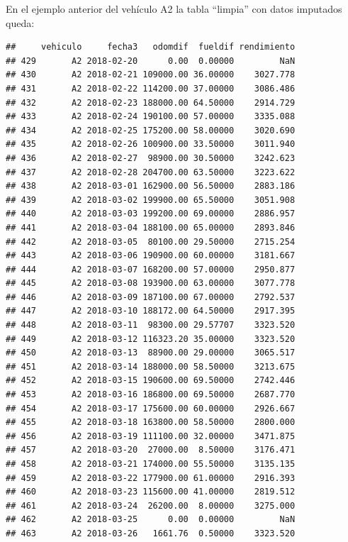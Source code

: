 \documentclass[]{article}
\newenvironment{Shaded}{\begin{snugshade}}{\end{snugshade}}
\newcommand{\StringTok}[1]{\textcolor[rgb]{0.31,0.60,0.02}{#1}}
\newcommand{\OperatorTok}[1]{\textcolor[rgb]{0.81,0.36,0.00}{\textbf{#1}}}
\newcommand{\NormalTok}[1]{#1}
\begin{document}
En el ejemplo anterior del vehículo A2 la tabla ``limpia'' con datos
imputados queda:

\begin{Shaded}
\end{Shaded}

\begin{verbatim}
##     vehiculo     fecha3   odomdif  fueldif rendimiento
## 429       A2 2018-02-20      0.00  0.00000         NaN
## 430       A2 2018-02-21 109000.00 36.00000    3027.778
## 431       A2 2018-02-22 114200.00 37.00000    3086.486
## 432       A2 2018-02-23 188000.00 64.50000    2914.729
## 433       A2 2018-02-24 190100.00 57.00000    3335.088
## 434       A2 2018-02-25 175200.00 58.00000    3020.690
## 435       A2 2018-02-26 100900.00 33.50000    3011.940
## 436       A2 2018-02-27  98900.00 30.50000    3242.623
## 437       A2 2018-02-28 204700.00 63.50000    3223.622
## 438       A2 2018-03-01 162900.00 56.50000    2883.186
## 439       A2 2018-03-02 199900.00 65.50000    3051.908
## 440       A2 2018-03-03 199200.00 69.00000    2886.957
## 441       A2 2018-03-04 188100.00 65.00000    2893.846
## 442       A2 2018-03-05  80100.00 29.50000    2715.254
## 443       A2 2018-03-06 190900.00 60.00000    3181.667
## 444       A2 2018-03-07 168200.00 57.00000    2950.877
## 445       A2 2018-03-08 193900.00 63.00000    3077.778
## 446       A2 2018-03-09 187100.00 67.00000    2792.537
## 447       A2 2018-03-10 188172.00 64.50000    2917.395
## 448       A2 2018-03-11  98300.00 29.57707    3323.520
## 449       A2 2018-03-12 116323.20 35.00000    3323.520
## 450       A2 2018-03-13  88900.00 29.00000    3065.517
## 451       A2 2018-03-14 188000.00 58.50000    3213.675
## 452       A2 2018-03-15 190600.00 69.50000    2742.446
## 453       A2 2018-03-16 186800.00 69.50000    2687.770
## 454       A2 2018-03-17 175600.00 60.00000    2926.667
## 455       A2 2018-03-18 163800.00 58.50000    2800.000
## 456       A2 2018-03-19 111100.00 32.00000    3471.875
## 457       A2 2018-03-20  27000.00  8.50000    3176.471
## 458       A2 2018-03-21 174000.00 55.50000    3135.135
## 459       A2 2018-03-22 177900.00 61.00000    2916.393
## 460       A2 2018-03-23 115600.00 41.00000    2819.512
## 461       A2 2018-03-24  26200.00  8.00000    3275.000
## 462       A2 2018-03-25      0.00  0.00000         NaN
## 463       A2 2018-03-26   1661.76  0.50000    3323.520

\end{verbatim}
\end{document}
